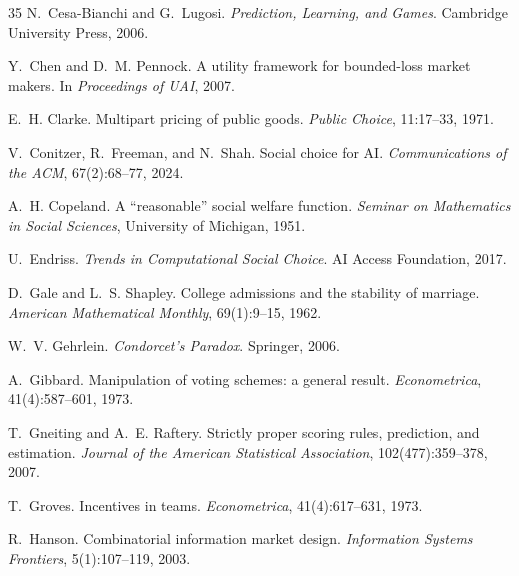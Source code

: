 \documentclass[10pt]{article}
\begin{document}
\begin{thebibliography}{35}
N.~Cesa-Bianchi and G.~Lugosi.
\newblock \emph{Prediction, Learning, and Games}.
\newblock Cambridge University Press, 2006.

Y.~Chen and D.~M. Pennock.
\newblock A utility framework for bounded-loss market makers.
\newblock In \emph{Proceedings of UAI}, 2007.

E.~H. Clarke.
\newblock Multipart pricing of public goods.
\newblock \emph{Public Choice}, 11:17--33, 1971.

V.~Conitzer, R.~Freeman, and N.~Shah.
\newblock Social choice for AI.
\newblock \emph{Communications of the ACM}, 67(2):68--77, 2024.

A.~H. Copeland.
\newblock A ``reasonable'' social welfare function.
\newblock \emph{Seminar on Mathematics in Social Sciences}, University of Michigan, 1951.

U.~Endriss.
\newblock \emph{Trends in Computational Social Choice}.
\newblock AI Access Foundation, 2017.

D.~Gale and L.~S. Shapley.
\newblock College admissions and the stability of marriage.
\newblock \emph{American Mathematical Monthly}, 69(1):9--15, 1962.

W.~V. Gehrlein.
\newblock \emph{Condorcet's Paradox}.
\newblock Springer, 2006.

A.~Gibbard.
\newblock Manipulation of voting schemes: a general result.
\newblock \emph{Econometrica}, 41(4):587--601, 1973.

T.~Gneiting and A.~E. Raftery.
\newblock Strictly proper scoring rules, prediction, and estimation.
\newblock \emph{Journal of the American Statistical Association}, 102(477):359--378, 2007.

T.~Groves.
\newblock Incentives in teams.
\newblock \emph{Econometrica}, 41(4):617--631, 1973.

R.~Hanson.
\newblock Combinatorial information market design.
\newblock \emph{Information Systems Frontiers}, 5(1):107--119, 2003.


\end{thebibliography}
\end{document}

